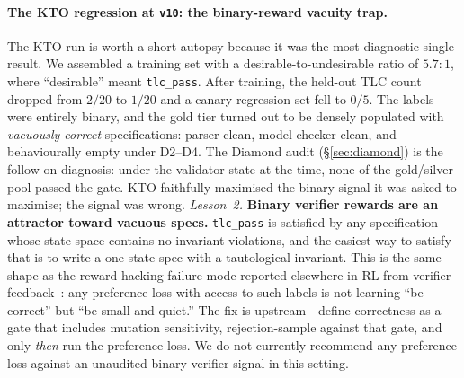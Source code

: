\documentclass[11pt]{article}
\begin{document}
\paragraph{The KTO regression at \texttt{v10}: the binary-reward
vacuity trap.} The KTO run is worth a short autopsy because it was the
most diagnostic single result. We assembled a training set with a
desirable-to-undesirable ratio of $5.7\!:\!1$, where ``desirable''
meant \texttt{tlc\_pass}. After training, the held-out TLC count
dropped from $2/20$ to $1/20$ and a canary regression set fell to
$0/5$. The labels were entirely binary, and the gold tier turned out to
be densely populated with \emph{vacuously correct} specifications:
parser-clean, model-checker-clean, and behaviourally empty under
D2--D4. The Diamond audit (\S\ref{sec:diamond}) is the follow-on
diagnosis: under the validator state at the time, none of the
gold/silver pool passed the gate. KTO faithfully maximised the binary
signal it was asked to maximise; the signal was wrong. \emph{Lesson~2.}
\textbf{Binary verifier rewards are an attractor toward vacuous specs.}
\texttt{tlc\_pass} is satisfied by any specification whose state space
contains no invariant violations, and the easiest way to satisfy that
is to write a one-state spec with a tautological invariant. This is
the same shape as the reward-hacking failure mode reported elsewhere
in RL from verifier feedback~\cite{skalse2022defining}: any preference
loss with access to such labels is not learning ``be correct'' but
``be small and quiet.'' The fix is upstream---define correctness as a
gate that includes mutation sensitivity, rejection-sample against that
gate, and only \emph{then} run the preference loss. We do not currently
recommend any preference loss against an unaudited binary verifier
signal in this setting.
\end{document}

